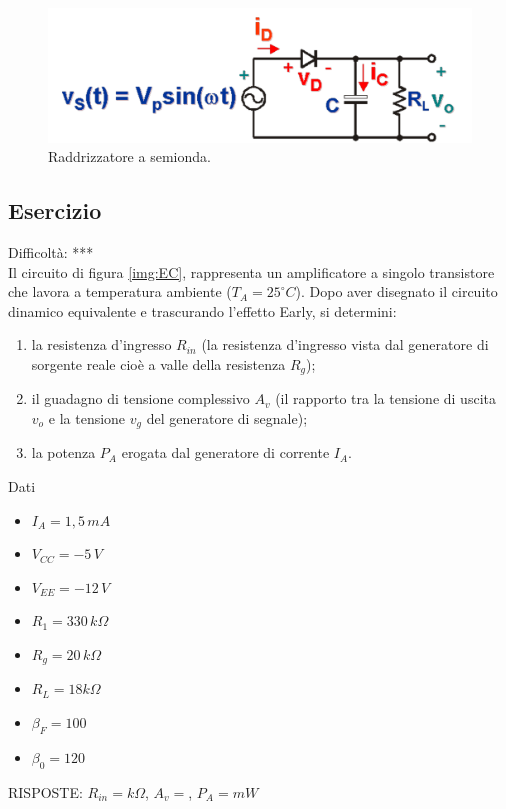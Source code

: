 \documentclass[a4paper,portrait,12pt]{article}
\theoremstyle{definition}
\begin{document}
\begin{figure}[H]
\centering
\includegraphics[width=.5\linewidth]{img/elettronicaEs/raddrizzatore.pdf}
\caption{Raddrizzatore a semionda.}
\label{img:raddrizzatore}
\end{figure}


\subsection{Esercizio}

Difficoltà: ***\\

Il circuito di figura \ref{img:EC}, rappresenta un amplificatore a singolo transistore che lavora a 
temperatura ambiente ($T_A = 25^{\circ}C$). Dopo aver disegnato il circuito dinamico equivalente e 
trascurando l'effetto Early, si determini:
\begin{enumerate}
\item la resistenza d'ingresso $R_{in}$ (la resistenza d'ingresso vista dal generatore di sorgente reale 
	cioè a valle della resistenza $R_g$);
\item il guadagno di tensione complessivo $A_v$ (il rapporto tra la tensione di uscita $v_o$ e la tensione 
	$v_g$ del generatore di segnale);
\item la potenza $P_A$ erogata dal generatore di corrente $I_A$.
\end{enumerate}

Dati
\begin{itemize}
\item $I_A = 1,5\,mA$
\item $V_{CC}=-5\,V$
\item $V_{EE}=-12\,V$ 
\item $R_1=330\,k\Omega$
\item $R_g=20\,k\Omega$
\item $R_L=18k\Omega$
\item $\beta_F=100$
\item $\beta_0=120$
\end{itemize}

RISPOSTE: $R_{in} = k\Omega$, $A_v = $, $P_A = mW$
\end{document}
